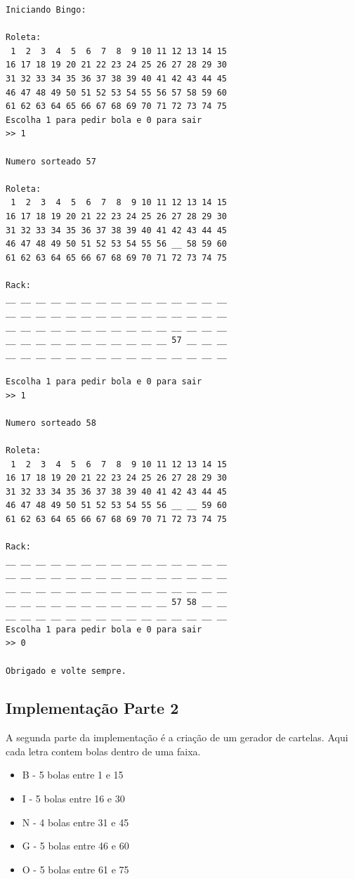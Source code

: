 \documentclass[12pt]{article}
\begin{document}
\begin{verbatim}
Iniciando Bingo:

Roleta:
 1  2  3  4  5  6  7  8  9 10 11 12 13 14 15 
16 17 18 19 20 21 22 23 24 25 26 27 28 29 30 
31 32 33 34 35 36 37 38 39 40 41 42 43 44 45 
46 47 48 49 50 51 52 53 54 55 56 57 58 59 60 
61 62 63 64 65 66 67 68 69 70 71 72 73 74 75 
Escolha 1 para pedir bola e 0 para sair
>> 1

Numero sorteado 57

Roleta:
 1  2  3  4  5  6  7  8  9 10 11 12 13 14 15 
16 17 18 19 20 21 22 23 24 25 26 27 28 29 30 
31 32 33 34 35 36 37 38 39 40 41 42 43 44 45 
46 47 48 49 50 51 52 53 54 55 56 __ 58 59 60 
61 62 63 64 65 66 67 68 69 70 71 72 73 74 75 

Rack:
__ __ __ __ __ __ __ __ __ __ __ __ __ __ __ 
__ __ __ __ __ __ __ __ __ __ __ __ __ __ __ 
__ __ __ __ __ __ __ __ __ __ __ __ __ __ __ 
__ __ __ __ __ __ __ __ __ __ __ 57 __ __ __ 
__ __ __ __ __ __ __ __ __ __ __ __ __ __ __ 

Escolha 1 para pedir bola e 0 para sair
>> 1

Numero sorteado 58

Roleta:
 1  2  3  4  5  6  7  8  9 10 11 12 13 14 15 
16 17 18 19 20 21 22 23 24 25 26 27 28 29 30 
31 32 33 34 35 36 37 38 39 40 41 42 43 44 45 
46 47 48 49 50 51 52 53 54 55 56 __ __ 59 60 
61 62 63 64 65 66 67 68 69 70 71 72 73 74 75 

Rack:
__ __ __ __ __ __ __ __ __ __ __ __ __ __ __ 
__ __ __ __ __ __ __ __ __ __ __ __ __ __ __ 
__ __ __ __ __ __ __ __ __ __ __ __ __ __ __ 
__ __ __ __ __ __ __ __ __ __ __ 57 58 __ __ 
__ __ __ __ __ __ __ __ __ __ __ __ __ __ __ 
Escolha 1 para pedir bola e 0 para sair
>> 0

Obrigado e volte sempre.
\end{verbatim}


\subsection{Implementação Parte 2}
A segunda parte da implementação é a criação de um gerador de cartelas.
Aqui cada letra contem bolas dentro de uma faixa.
\begin{itemize}
\item B - 5 bolas entre 1 e 15
\item I - 5 bolas entre 16 e 30
\item N - 4 bolas entre 31 e 45
\item G - 5 bolas entre 46 e 60
\item O - 5 bolas entre 61 e 75
\end{itemize}
\end{document}
